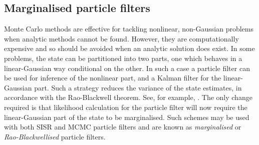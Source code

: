 \subsection{Marginalised particle filters}
Monte Carlo methods are effective for tackling nonlinear, non-Gaussian problems when analytic methods cannot be found. However, they are computationally expensive and so should be avoided when an analytic solution does exist. In some problems, the state can be partitioned into two parts, one which behaves in a linear-Gaussian way conditional on the other. In such a case a particle filter can be used for inference of the nonlinear part, and a Kalman filter for the linear-Gaussian part. Such a strategy reduces the variance of the state estimates, in accordance with the Rao-Blackwell theorem. See, for example, \cite{Casella1996}. The only change required is that likelihood calculation for the particle filter will now require the linear-Gaussian part of the state to be marginalised. Such schemes may be used with both SISR and MCMC particle filters and are known as \emph{marginalised} or \emph{Rao-Blackwellised} particle filters.


